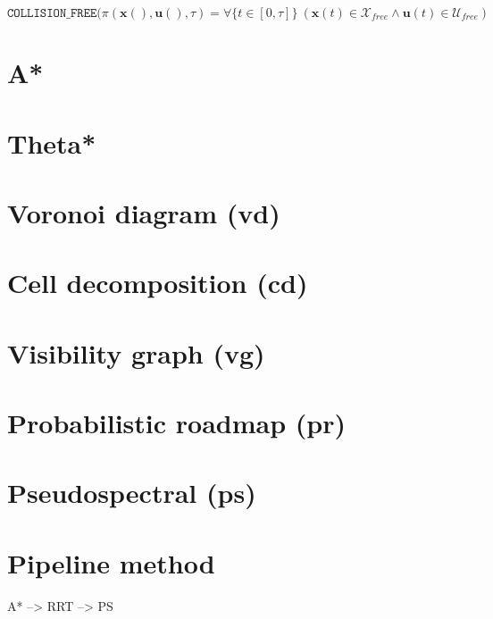 \begin{equation}
  \mathtt{COLLISION\_FREE}(\pi(\textbf{x}(),\textbf{u}(),\tau) = \forall \{ t \in [0,\tau] \} \ (\textbf{x}(t) \in \mathcal{X}_{free} \land \textbf{u}(t) \in \mathcal{U}_{free})
\end{equation}
 




\section{A*}
\section{Theta*}
\section{Voronoi diagram (\gls{vd})}
\section{Cell decomposition (\gls{cd})}
\section{Visibility graph (\gls{vg})}
\section{Probabilistic roadmap (\gls{pr})}
\section{Pseudospectral (\gls{ps})}
\section{Pipeline method}
A* --> RRT --> PS

